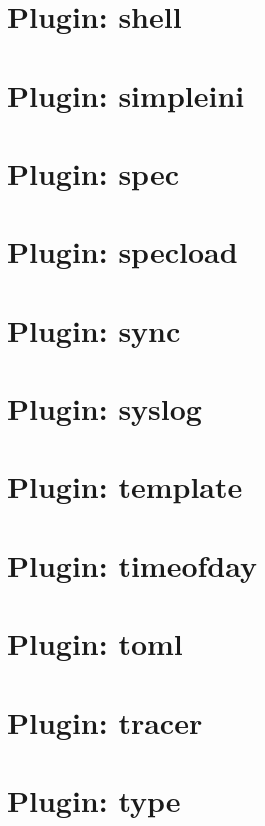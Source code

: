 \documentclass[twoside]{book}
\newcommand{\+}{\discretionary{\mbox{\scriptsize$\hookleftarrow$}}{}{}}
\begin{document}
\chapter{Plugin\+: shell}
\label{autotoc_md604}

\chapter{Plugin\+: simpleini}
\label{autotoc_md606}

\chapter{Plugin\+: spec}
\label{autotoc_md612}

\chapter{Plugin\+: specload}
\label{autotoc_md625}

\chapter{Plugin\+: sync}
\label{autotoc_md631}

\chapter{Plugin\+: syslog}
\label{autotoc_md633}

\chapter{Plugin\+: template}
\label{autotoc_md634}

\chapter{Plugin\+: timeofday}
\label{autotoc_md639}

\chapter{Plugin\+: toml}
\label{autotoc_md642}

\chapter{Plugin\+: tracer}
\label{autotoc_md749}

\chapter{Plugin\+: type}
\label{autotoc_md752}

\end{document}
